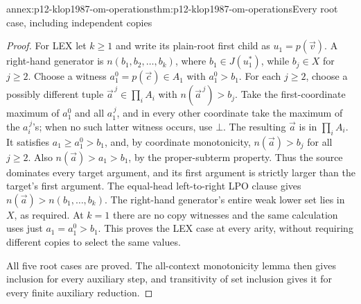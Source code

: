 \begin{annexitem}{annex:p12-klop1987-om-operations}{thm:p12-klop1987-om-operations}{Every root case, including independent copies}
\begin{proof}
For LEX let \(k\geq1\) and write its plain-root first child
as \(u_1=p(\vec v)\). A right-hand generator is
\(n(b_1,b_2,\ldots,b_k)\), where
\(b_1\in J(u_1^*)\), while \(b_j\in X\) for \(j\geq2\).
Choose a witness \(a_1^0=p(\vec c)\in A_1\) with
\(a_1^0>b_1\). For each \(j\geq2\), choose a possibly
different tuple \(\vec a^{\,j}\in\prod_i A_i\) with
\(n(\vec a^{\,j})>b_j\). Take the first-coordinate maximum
of \(a_1^0\) and all \(a_1^{\,j}\), and in every other
coordinate take the maximum of the \(a_i^{\,j}\)'s; when no
such latter witness occurs, use \(\bot\). The resulting
\(\vec a\) is in \(\prod_i A_i\). It satisfies
\(a_1\geq a_1^0>b_1\), and, by coordinate monotonicity,
\(n(\vec a)>b_j\) for all \(j\geq2\). Also
\(n(\vec a)>a_1>b_1\), by the proper-subterm property.
Thus the source dominates every target argument, and its first
argument is strictly larger than the target's first argument.
The equal-head left-to-right LPO clause gives
\(n(\vec a)>n(b_1,\ldots,b_k)\). The right-hand generator's
entire weak lower set lies in \(X\), as required. At \(k=1\)
there are no copy witnesses and the same calculation uses just
\(a_1=a_1^0>b_1\). This proves the LEX case at every arity,
without requiring different copies to select the same values.

All five root cases are proved. The all-context monotonicity lemma
then gives inclusion for every auxiliary step, and transitivity of
set inclusion gives it for every finite auxiliary reduction.
\end{proof}
\end{annexitem}

